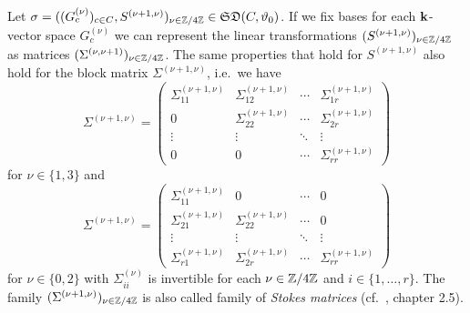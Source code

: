 Let $\sigma = ((G_c^{(\nu)})_{c \in C},S^{(\nu+1,\nu)})_{\nu \in \mathbb{Z}/4\mathbb{Z}} \in \mathfrak{SD}(C,\vartheta_0)$. If we fix bases for each $\mathbf{k}$-vector space $G_c^{(\nu)}$ we can represent the linear transformations $(S^{(\nu+1, \nu)})_{\nu \in \mathbb{Z}/4\mathbb{Z}}$ as matrices $(\Sigma^{(\nu,\nu+1)})_{\nu \in \mathbb{Z}/4\mathbb{Z}}$. The same properties that hold for $S^{(\nu+1, \nu)}$ also hold for the block matrix $\Sigma^{(\nu+1,\nu)}$, i.e.\ we have
    \[
    \Sigma^{(\nu+1,\nu)} = 
    \begin{pmatrix}
    \Sigma_{11}^{(\nu+1,\nu)} & \Sigma_{12}^{(\nu+1,\nu)} & \cdots & \Sigma_{1r}^{(\nu+1,\nu)} \\ 0 & \Sigma_{22}^{(\nu+1,\nu)}& \cdots & \Sigma_{2r}^{(\nu+1,\nu)} \\
\vdots & \vdots & \ddots & \vdots \\ 
    0 & 0 & \cdots & \Sigma_{rr}^{(\nu+1,\nu)}
\end{pmatrix} \] for $\nu \in \{1,3\}$ and 
\[ \Sigma^{(\nu+1,\nu)} = 
    \begin{pmatrix}
    \Sigma_{11}^{(\nu+1,\nu)} & 0 & \cdots & 0 \\ \Sigma_{21}^{(\nu+1,\nu)} & \Sigma_{22}^{(\nu+1,\nu)}& \cdots & 0 \\
\vdots & \vdots & \ddots & \vdots \\ 
    \Sigma_{r1}^{(\nu+1,\nu)} & \Sigma_{2r}^{(\nu+1,\nu)} & \cdots & \Sigma_{rr}^{(\nu+1,\nu)}
\end{pmatrix}
    \] for $\nu \in \{0,2\}$ with $\Sigma_{ii}^{(\nu)}$ is invertible for each $\nu \in \mathbb{Z}/4\mathbb{Z}$ and $i \in \{1, \dots, r\}$.
The family $(\Sigma^{(\nu+1,\nu)})_{\nu \in \mathbb{Z}/4\mathbb{Z}}$ is also called family of \emph{Stokes matrices}  
(cf.\ \cite{Hohl_Diss}, chapter 2.5).
\newline

\begin{comment}
A family of Stokes matrices $(\Sigma^{(\nu+1,\nu)})_{\nu \in \Z/4\Z}$ is equivalent to another family of Stokes matrices $(\tilde{\Sigma}^{(\nu+1,\nu)})_{\nu \in \Z/4\Z}$ if there exists a family of invertible, block-diagnonal matrices $(\Lambda^{(\nu)})_{\nu \in \Z/4\Z}$, such that for any pair $(i,j) \in \{1, \dots, r\}^2$ and for any $\nu \in \Z/4\Z$ the equation
\[
\tilde{\Sigma}^{(\nu+1,\nu)}_{ij} = \Lambda_i^{(\nu+1)}\Sigma_{ij}^{(\nu+1,\nu)}(\Lambda_{j}^{(\nu)})^{-1}
\]
holds.

\begin{lem}
\textcolor{gray}{Let $(\Sigma^{(\nu+1,\nu)})_{\nu \in \Z/4\Z}$ be a family of Stokes matrices. Then there exists a family of Stokes matrices $(\tilde{\Sigma}^{(\nu+1,\nu)})$ with $\tilde{\Sigma}_{ii}^{(\nu+1,\nu)} = \id$ for $\nu \in \{0,1,2\}$ and $\tilde{\Sigma}_{ii}^{(0,3)} = T_i \coloneqq \Sigma_{ii}^{(0,3)}\Sigma_{ii}^{(3,2)}\Sigma_{ii}^{(2,1)}\Sigma_{ii}^{(1,0)}$ that is equivalent to $(\Sigma^{(\nu+1,\nu)})_{\nu \in \Z/4\Z}$.}
\end{lem}
\begin{proof}
    \textcolor{gray}{Vgl. Beweis iPad S.8f. Gaussian Type}
\end{proof}
\end{comment}

